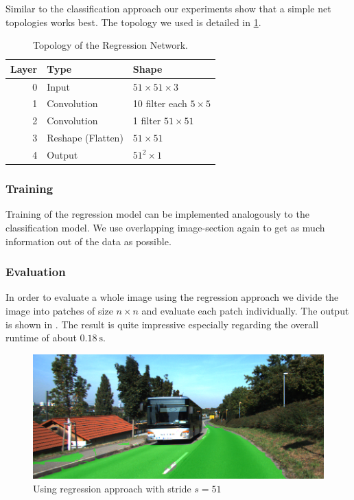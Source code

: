 Similar to the classification approach our experiments show that a simple net topologies works best. The topology we used is detailed in \cref{tab:topo2}.

\begin{table}[H]
	\normalsize
	\centering
	\begin{tabular}{r l l}
		\toprule
		\textbf{Layer} & \textbf{Type}  & \textbf{Shape}  \\
		\midrule
		0     & Input &  $51 \times 51 \times 3$ \\
		1     & Convolution & 10 filter  each $5 \times 5$ \\
		2     & Convolution & 1 filter $51 \times 51$  \\
		3     & Reshape (Flatten) & $51 \times 51$ \\
		4     & Output     & $51^2 \times 1$ \\
		\bottomrule
	\end{tabular}
	\caption{Topology of the Regression Network.}
	\label{tab:topo2}
\end{table}

\subsubsection{Training}

Training of the regression model can be implemented analogously to the classification model. We use overlapping image-section again to get as much information out of the data as possible.

\subsubsection{Evaluation}

In order to evaluate a whole image using the regression approach we divide the image into patches of size $n \times n$ and evaluate each patch individually. The output is shown in . The result is quite impressive especially regarding the overall runtime of about $\SI{0.18}{\second}$.

\begin{figure}[]
	\centering
	\includegraphics[width=\columnwidth]{figures/models/testing2-um_32_conv_stride51.png}
	\caption{Using regression approach with stride $s=51$}
	\label{fig:reg_stride2}
\end{figure}



